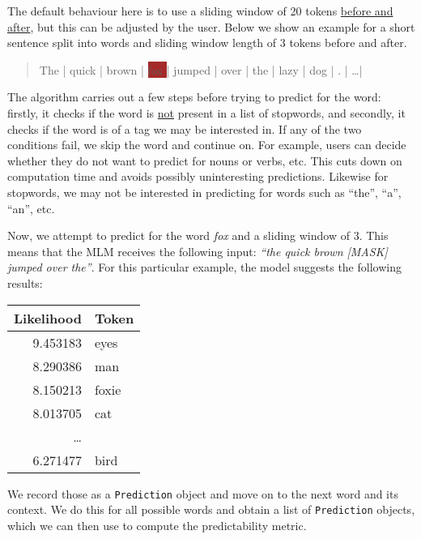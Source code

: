     The default behaviour here is to use a sliding window of 20 tokens \underline{before and after}, but this can be adjusted by the user. Below we show an example for a short sentence split into words and sliding window length of 3 tokens before and after. 
    \begin{quotation}
        The  | quick | brown | \colorbox{brown}{ fox } | jumped | over | the | lazy | dog |   .   |   \dots   |
    \end{quotation}

    The algorithm carries out a few steps before trying to predict for the word: firstly, it checks if the word is \underline{not} present in a list of stopwords, and secondly, it checks if the word is of a tag we may be interested in. If any of the two conditions fail, we skip the word and continue on. For example, users can decide whether they do not want to predict for nouns or verbs, etc. This cuts down on computation time and avoids possibly uninteresting predictions. Likewise for stopwords, we may not be interested in predicting for words such as ``the'', ``a'', ``an'', etc.

    Now, we attempt to predict for the word \textit{fox} and a sliding window of 3. This means that the MLM receives the following input: \textit{``the quick brown [MASK] jumped over the''}. For this particular example, the model suggests the following results:

    \begin{table}[htbp]
        \centering
          \begin{tabular}{rl}
        \toprule
               Likelihood &       Token \\
        \midrule
        9.453183 &    eyes \\
        8.290386 &     man \\
        8.150213 &   foxie \\
        8.013705 &     cat \\
        \dots \\
        6.271477 &    bird \\
        \bottomrule
        \end{tabular}  
    \end{table}


        We record those as a \texttt{Prediction} object and move on to the next word and its context. We do this for all possible words and obtain a list of \texttt{Prediction} objects, which we can then use to compute the predictability metric.


